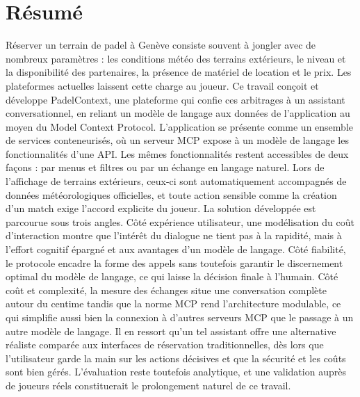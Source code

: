 \documentclass[12pt]{article}
\let\stdsection\section
\renewcommand{\section}{\clearpage\stdsection}
\begin{document}
\section{Résumé}
Réserver un terrain de padel à Genève consiste souvent à jongler avec de nombreux paramètres : les conditions météo des terrains extérieurs, le niveau et la disponibilité des partenaires, la présence de matériel de location et le prix. Les plateformes actuelles laissent cette charge au joueur. Ce travail conçoit et développe PadelContext, une plateforme qui confie ces arbitrages à un assistant conversationnel, en reliant un modèle de langage aux données de l'application au moyen du Model Context Protocol.
\newline\newline
L'application se présente comme un ensemble de services conteneurisés, où un serveur MCP expose à un modèle de langage les fonctionnalités d'une API. Les mêmes fonctionnalités restent accessibles de deux façons : par menus et filtres ou par un échange en langage naturel. Lors de l'affichage de terrains extérieurs, ceux-ci sont automatiquement accompagnés de données météorologiques officielles, et toute action sensible comme la création d'un match exige l'accord explicite du joueur.
\newline\newline
La solution développée est parcourue sous trois angles. Côté expérience utilisateur, une modélisation du coût d'interaction montre que l'intérêt du dialogue ne tient pas à la rapidité, mais à l'effort cognitif épargné et aux avantages d'un modèle de langage. Côté fiabilité, le protocole encadre la forme des appels sans toutefois garantir le discernement optimal du modèle de langage, ce qui laisse la décision finale à l'humain. Côté coût et complexité, la mesure des échanges situe une conversation complète autour du centime tandis que la norme MCP rend l'architecture modulable, ce qui simplifie aussi bien la connexion à d'autres serveurs MCP que le passage à un autre modèle de langage.
\newline\newline
Il en ressort qu'un tel assistant offre une alternative réaliste comparée aux interfaces de réservation traditionnelles, dès lors que l'utilisateur garde la main sur les actions décisives et que la sécurité et les coûts sont bien gérés. L'évaluation reste toutefois analytique, et une validation auprès de joueurs réels constituerait le prolongement naturel de ce travail.
\newpage

\listoftables
\end{document}
